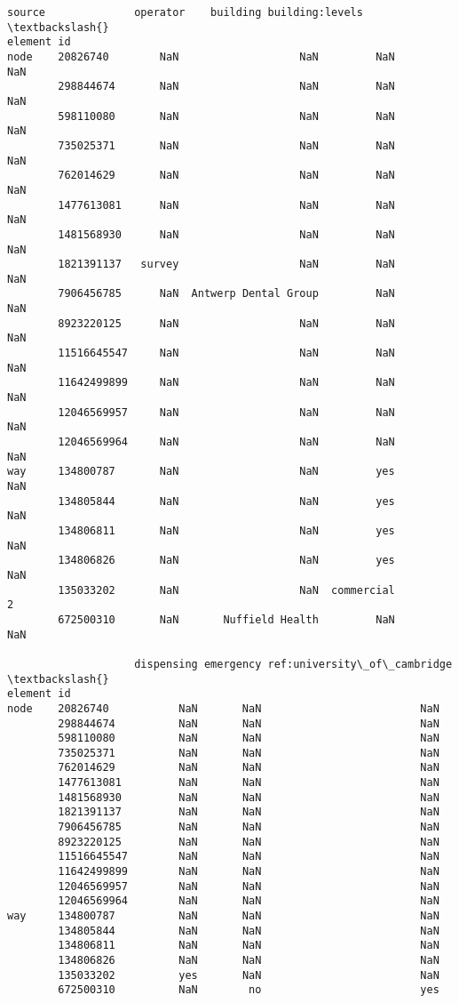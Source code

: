 \documentclass[11pt]{article}
\begin{document}
\begin{tcolorbox}[breakable, size=fbox, boxrule=.5pt, pad at break*=1mm, opacityfill=0]
\begin{Verbatim}[commandchars=\\\{\}]
                     source              operator    building building:levels  \textbackslash{}
element id
node    20826740        NaN                   NaN         NaN             NaN
        298844674       NaN                   NaN         NaN             NaN
        598110080       NaN                   NaN         NaN             NaN
        735025371       NaN                   NaN         NaN             NaN
        762014629       NaN                   NaN         NaN             NaN
        1477613081      NaN                   NaN         NaN             NaN
        1481568930      NaN                   NaN         NaN             NaN
        1821391137   survey                   NaN         NaN             NaN
        7906456785      NaN  Antwerp Dental Group         NaN             NaN
        8923220125      NaN                   NaN         NaN             NaN
        11516645547     NaN                   NaN         NaN             NaN
        11642499899     NaN                   NaN         NaN             NaN
        12046569957     NaN                   NaN         NaN             NaN
        12046569964     NaN                   NaN         NaN             NaN
way     134800787       NaN                   NaN         yes             NaN
        134805844       NaN                   NaN         yes             NaN
        134806811       NaN                   NaN         yes             NaN
        134806826       NaN                   NaN         yes             NaN
        135033202       NaN                   NaN  commercial               2
        672500310       NaN       Nuffield Health         NaN             NaN

                    dispensing emergency ref:university\_of\_cambridge  \textbackslash{}
element id
node    20826740           NaN       NaN                         NaN
        298844674          NaN       NaN                         NaN
        598110080          NaN       NaN                         NaN
        735025371          NaN       NaN                         NaN
        762014629          NaN       NaN                         NaN
        1477613081         NaN       NaN                         NaN
        1481568930         NaN       NaN                         NaN
        1821391137         NaN       NaN                         NaN
        7906456785         NaN       NaN                         NaN
        8923220125         NaN       NaN                         NaN
        11516645547        NaN       NaN                         NaN
        11642499899        NaN       NaN                         NaN
        12046569957        NaN       NaN                         NaN
        12046569964        NaN       NaN                         NaN
way     134800787          NaN       NaN                         NaN
        134805844          NaN       NaN                         NaN
        134806811          NaN       NaN                         NaN
        134806826          NaN       NaN                         NaN
        135033202          yes       NaN                         NaN
        672500310          NaN        no                         yes


\end{Verbatim}
\end{tcolorbox}
\end{document}
